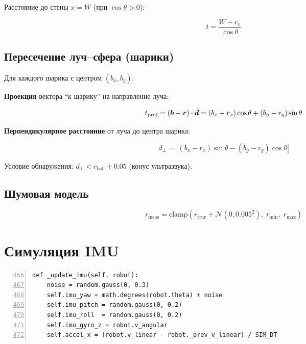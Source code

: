 Расстояние до стены $x = W$ (при $\cos\theta > 0$):

\begin{equation}
  t = \frac{W - r_x}{\cos\theta}
  \label{eq:ray_wall}
\end{equation}

\subsection{Пересечение луч--сфера (шарики)}

Для каждого шарика с центром $(b_x, b_y)$:

\textbf{Проекция} вектора ``к шарику'' на направление луча:

\begin{equation}
  t_{\text{proj}} = (\bm{b} - \bm{r}) \cdot \hat{\bm{d}}
  = (b_x - r_x)\cos\theta + (b_y - r_y)\sin\theta
  \label{eq:ball_proj}
\end{equation}

\textbf{Перпендикулярное расстояние} от луча до центра шарика:

\begin{equation}
  d_{\perp} = |(b_x - r_x)\sin\theta - (b_y - r_y)\cos\theta|
  \label{eq:ball_perp}
\end{equation}

Условие обнаружения: $d_\perp < r_{\text{ball}} + 0.05$ (конус ультразвука).

\subsection{Шумовая модель}

\begin{equation}
  r_{\text{meas}} = \mathrm{clamp}(r_{\text{true}} + \mathcal{N}(0, 0.005^2),\;
  r_{\min},\; r_{\max})
  \label{eq:ultrasonic_noise}
\end{equation}

\section{Симуляция IMU}

\begin{filebox}[title={\filepath{simulator.py}, строки 466--472 --- \_update\_imu()}]
\begin{lstlisting}[style=pythonstyle, numbers=left, firstnumber=466]
def _update_imu(self, robot):
    noise = random.gauss(0, 0.3)
    self.imu_yaw = math.degrees(robot.theta) + noise
    self.imu_pitch = random.gauss(0, 0.2)
    self.imu_roll  = random.gauss(0, 0.2)
    self.imu_gyro_z = robot.v_angular
    self.accel_x = (robot.v_linear - robot._prev_v_linear) / SIM_DT
\end{lstlisting}
\end{filebox}

